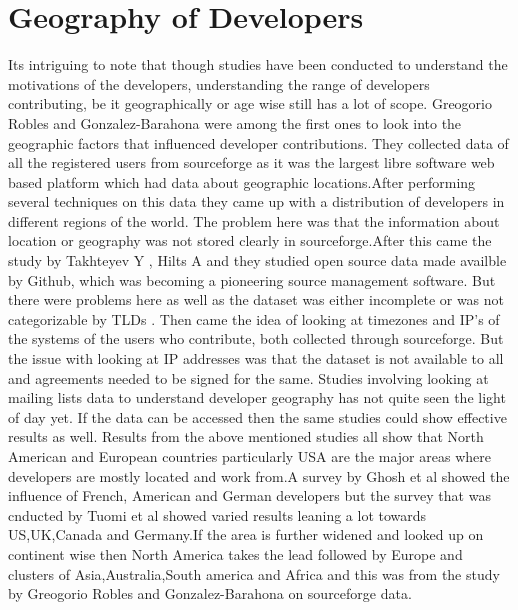 \documentclass[double,12pt]{beavtex}
\begin{document}
\section{Geography of Developers}
Its intriguing to note that though studies have been conducted to understand the motivations of the developers, understanding the range of developers contributing, be it geographically or age wise still has a lot of scope. Greogorio Robles and Gonzalez-Barahona were among the first ones to look into the geographic factors that influenced developer contributions. They collected data of all the registered users from sourceforge as it was the largest libre software web based platform which had data about geographic locations.After performing several techniques on this data they came up with a distribution of developers in different regions of the world\cite{robles2006}. The problem here was that the information about location or geography was not stored clearly in sourceforge.After this came the study by Takhteyev Y , Hilts A and they studied open source data made availble by Github, which was becoming a pioneering source management software. But there were problems here as well as the dataset was either incomplete or was not categorizable by TLDs \cite{yuri2010}. Then came the idea of looking at timezones and IP's of the systems of the users who contribute, both collected through sourceforge. But the issue with looking at IP addresses was that the dataset is not available to all and agreements needed to be signed for the same\cite{von2010}. Studies involving looking at mailing lists data to understand developer geography has not quite seen the light of day yet. If the data can be accessed then the same studies could show effective results as well. Results from the above mentioned studies all show that North American and European countries particularly USA are the major areas where developers are mostly located and work from.A survey by Ghosh et al\cite{ghosh2005} showed the influence of French, American and German developers but the survey that was cnducted by Tuomi et al\cite{tuomi2004} showed varied results leaning a lot towards US,UK,Canada and Germany.If the area is further widened and looked up on continent wise then North America takes the lead followed by Europe and clusters of Asia,Australia,South america and Africa and this was from the study by Greogorio Robles and Gonzalez-Barahona on sourceforge data\cite{robles2006}.
\end{document}
